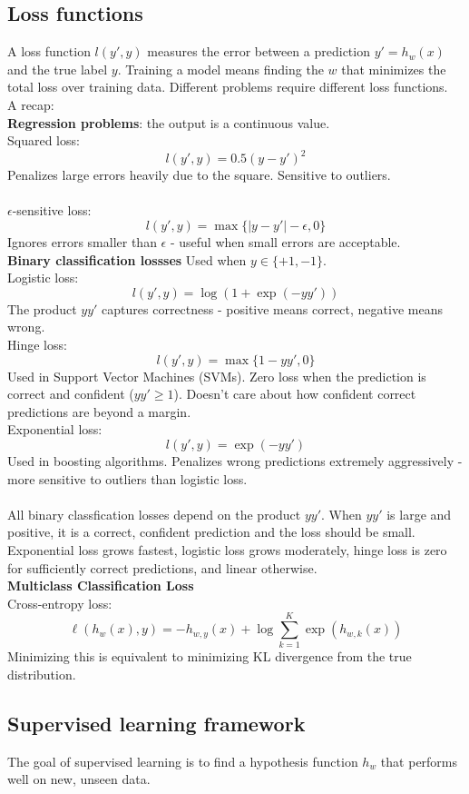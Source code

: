 \documentclass[../Probability.tex]{subfiles}
\begin{document}
\subsection{Loss functions}
A loss function $l(y', y)$ measures the error between a prediction $y' = h_w(x)$ and the true label $y$. Training a model means finding the $w$ that minimizes the total loss over training data.
Different problems require different loss functions.\\
A recap:\\
\textbf{Regression problems}: the output is a continuous value.\\
Squared loss:
$$l(y', y) = 0.5(y - y')^2$$
Penalizes large errors heavily due to the square. Sensitive to outliers.\\
\\
$\epsilon$-sensitive loss:
$$l(y', y) = \max\{|y - y'| - \epsilon, 0\}$$
Ignores errors smaller than $\epsilon$ - useful when small errors are acceptable.\\
\textbf{Binary classification lossses} Used when $y\in\{+1, -1\}$.\\
Logistic loss:
$$l(y', y) = \log(1 + \exp(-yy'))$$
The product $yy'$ captures correctness - positive means correct, negative means wrong.\\
Hinge loss:
$$l(y', y) = \max\{1 - yy', 0\}$$
Used in Support Vector Machines (SVMs). Zero loss when the prediction is correct and confident ($yy' \geq 1$). Doesn't care about how confident correct predictions are beyond a margin.\\
Exponential loss:
$$l(y', y) = \exp(-yy')$$
Used in boosting algorithms. Penalizes wrong predictions extremely aggressively - more sensitive to outliers than logistic loss.\\
\\
All binary classfication losses depend on the product $yy'$. When $yy'$ is large and positive, it is a correct, confident prediction and the loss should be small.\\
Exponential loss grows fastest, logistic loss grows moderately, hinge loss is zero for sufficiently correct predictions, and linear otherwise.\\
\textbf{Multiclass Classification Loss}\\
Cross-entropy loss:
$$\ell(h_w(x), y) = -h_{w,y}(x) + \log \sum_{k=1}^{K} \exp(h_{w,k}(x))$$
Minimizing this is equivalent to minimizing KL divergence from the true distribution.

\subsection{Supervised learning framework}
The goal of supervised learning is to find a hypothesis function $h_w$ that performs well on new, unseen data.
\end{document}

